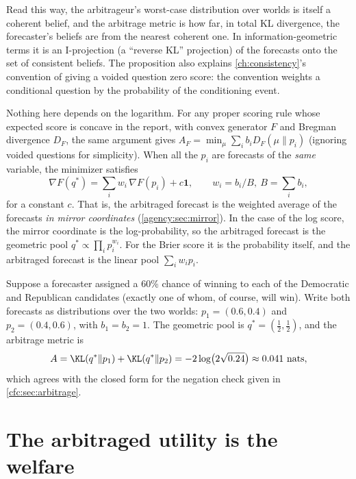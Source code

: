 \begin{draftblock}
Read this way, the arbitrageur's worst-case distribution over worlds is itself a coherent belief, and the arbitrage metric is how far, in total KL divergence, the forecaster's beliefs are from the nearest coherent one. In information-geometric terms it is an I-projection (a ``reverse KL'' projection) of the forecasts onto the set of consistent beliefs. The proposition also explains \cref{ch:consistency}'s convention of giving a voided question zero score: the convention weights a conditional question by the probability of the conditioning event.

Nothing here depends on the logarithm. For any proper scoring rule whose expected score is concave in the report, with convex generator $F$ and Bregman divergence $D_F$, the same argument gives $A_F=\min_\mu\sum_ib_iD_F(\mu\|p_i)$ (ignoring voided questions for simplicity). When all the $p_i$ are forecasts of the \emph{same} variable, the minimizer satisfies
\begin{equation}\label{arb:eq:mirror-average}
\nabla F(q^*)=\sum_i w_i\,\nabla F(p_i)+c\mathbf 1,\qquad w_i=b_i/B,\ B=\textstyle\sum_ib_i,
\end{equation}
for a constant $c$. That is, the arbitraged forecast is the weighted average of the forecasts \emph{in mirror coordinates} (\cref{agency:sec:mirror}). In the case of the log score, the mirror coordinate is the log-probability, so the arbitraged forecast is the geometric pool $q^*\propto\prod_ip_i^{w_i}$. For the Brier score it is the probability itself, and the arbitraged forecast is the linear pool $\sum_iw_ip_i$.

\begin{example}\label{arb:ex:election}
Suppose a forecaster assigned a 60\% chance of winning to each of the Democratic and Republican candidates (exactly one of whom, of course, will win). Write both forecasts as distributions over the two worlds: $p_1=(0.6,0.4)$ and $p_2=(0.4,0.6)$, with $b_1=b_2=1$. The geometric pool is $q^*=(\tfrac12,\tfrac12)$, and the arbitrage metric is
\[
A=\KL(q^*\|p_1)+\KL(q^*\|p_2)=-2\log\!\big(2\sqrt{0.24}\big)\approx0.041\ \text{nats},
\]
which agrees with the closed form for the negation check given in \cref{cfc:sec:arbitrage}.
\end{example}

\section{The arbitraged utility is the welfare}\label{arb:sec:welfare}


\end{draftblock}
